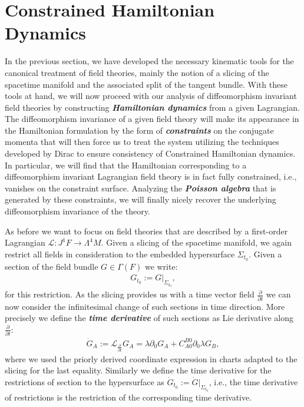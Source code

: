 \section{Constrained Hamiltonian Dynamics}
In the previous section, we have developed the necessary kinematic tools for the canonical treatment of field theories, mainly the notion of a slicing of the spacetime manifold and the associated split of the tangent bundle. With these tools at hand, we will now proceed with our analysis of diffeomorphism invariant field theories by constructing \textbf{\textit{Hamiltonian dynamics}} from a given Lagrangian.
The diffeomorphism invariance of a given field theory will make its appearance in the Hamiltonian formulation by the form of \textit{\textbf{constraints}} on the conjugate momenta that will then force us to treat the system utilizing the techniques developed by Dirac to ensure consistency of Constrained Hamiltonian dynamics.
In particular, we will find that the Hamiltonian corresponding to a diffeomorphism invariant Lagrangian field theory is in fact fully constrained, i.e., vanishes on the constraint surface. Analyzing the \textit{\textbf{Poisson algebra}} that is generated by these constraints, we will finally nicely recover the underlying diffeomorphism invariance of the theory.

As before we want to focus on field theories that are described by a first-order Lagrangian $\mathcal{L} : J^1F \rightarrow \Lambda^4M$. Given a slicing of the spacetime manifold, we again restrict all fields in consideration to the embedded hypersurface $\Sigma_{t_0}$. Given a section of the field bundle $G \in \Gamma(F)$ we write: 
\begin{align}
     G_{t_0} := G \vert _{\Sigma_{t_0}},
\end{align}
for this restriction. As the slicing provides us with a time vector field $\frac{\partial}{\partial t}$ we can now consider the infinitesimal change of such sections in time direction. More precisely we define the \textbf{\textit{time derivative}} of such sections as Lie derivative along $\frac{\partial}{\partial t}$: 
\begin{align}
    \dot{G}_A := \mathcal{L}_{\frac{\partial}{\partial t}}G_A = \lambda \partial_0 G_A + C^{B0}_{A0} \partial_0 \lambda G_B,
\end{align}
where we used the priorly derived coordinate expression in charts adapted to the slicing for the last equality. Similarly we define the time derivative for the restrictions of section to the hypersurface as $\dot{G}_{t_0}:= \dot{G} \vert_{\Sigma_{t_0}}$, i.e., the time derivative of restrictions is the restriction of the corresponding time derivative.

